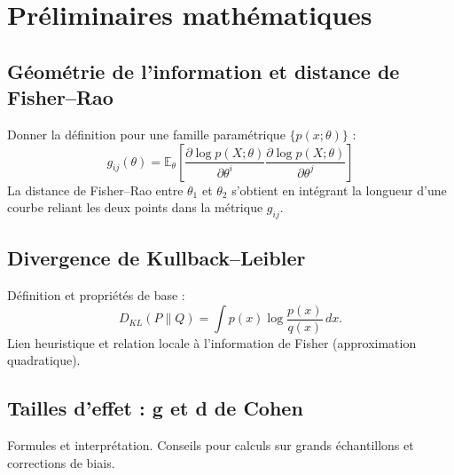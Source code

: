 \chapter{Préliminaires mathématiques}
\label{chap:math}
\section{Géométrie de l'information et distance de Fisher--Rao}
Donner la définition pour une famille paramétrique $\{p(x;\theta)\}$ :
\begin{equation}
	g_{ij}(\theta) = \mathbb{E}_{\theta}\left[ \frac{\partial \log p(X;\theta)}{\partial \theta^i} \frac{\partial \log p(X;\theta)}{\partial \theta^j} \right]
\end{equation}
La distance de Fisher--Rao entre $\theta_1$ et $\theta_2$ s'obtient en intégrant la longueur d'une courbe reliant les deux points dans la métrique $g_{ij}$.


\section{Divergence de Kullback--Leibler}
Définition et propriétés de base :
\begin{equation}
	D_{KL}(P\|Q) = \int p(x) \log\frac{p(x)}{q(x)}\,dx.
\end{equation}
Lien heuristique et relation locale à l'information de Fisher (approximation quadratique).


\section{Tailles d'effet : g et d de Cohen}
Formules et interprétation. Conseils pour calculs sur grands échantillons et corrections de biais.

